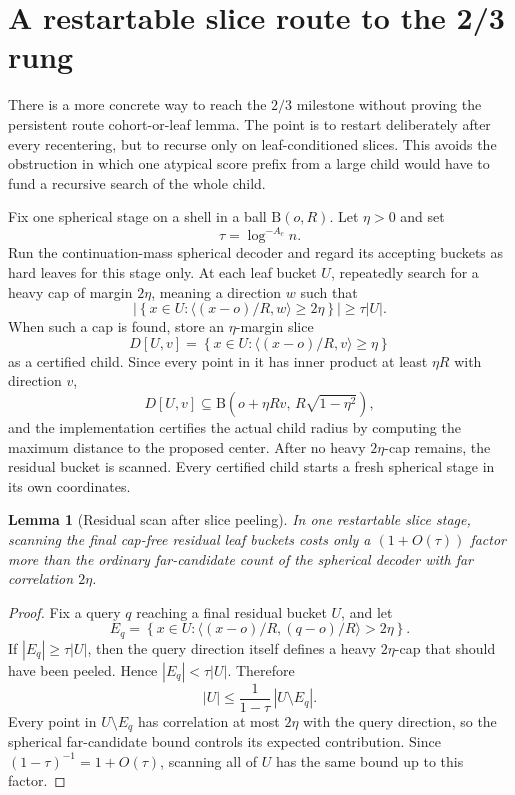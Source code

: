 \documentclass[10pt]{article}
\newtheorem{lemma}[theorem]{Lemma}
\theoremstyle{definition}
\newcommand{\Ball}{\mathrm{B}}
\newcommand{\ip}[2]{\langle #1,#2\rangle}
\begin{document}
\section{A restartable slice route to the 2/3 rung}

There is a more concrete way to reach the $2/3$ milestone without proving the persistent route cohort-or-leaf lemma. The point is to restart deliberately after every recentering, but to recurse only on leaf-conditioned slices. This avoids the obstruction in which one atypical score prefix from a large child would have to fund a recursive search of the whole child.

Fix one spherical stage on a shell in a ball $\Ball(o,R)$. Let $\eta>0$ and set
\[
   \tau=\log^{-A_c} n.
\]
Run the continuation-mass spherical decoder and regard its accepting buckets as hard leaves for this stage only. At each leaf bucket $U$, repeatedly search for a heavy cap of margin $2\eta$, meaning a direction $w$ such that
\[
   \left|\left\{x\in U:\ip{(x-o)/R}{w}\ge 2\eta\right\}\right|
   \ge \tau |U|.
\]
When such a cap is found, store an $\eta$-margin slice
\[
   D[U,v]=\left\{x\in U:\ip{(x-o)/R}{v}\ge \eta\right\}
\]
as a certified child. Since every point in it has inner product at least $\eta R$ with direction $v$,
\[
   D[U,v]\subseteq \Ball(o+\eta Rv,\,R\sqrt{1-\eta^2}),
\]
and the implementation certifies the actual child radius by computing the maximum distance to the proposed center. After no heavy $2\eta$-cap remains, the residual bucket is scanned. Every certified child starts a fresh spherical stage in its own coordinates.

\begin{lemma}[Residual scan after slice peeling]\label{lem:slice-residual}
   In one restartable slice stage, scanning the final cap-free residual leaf buckets costs only a $(1+O(\tau))$ factor more than the ordinary far-candidate count of the spherical decoder with far correlation $2\eta$.
\end{lemma}

\begin{proof}
   Fix a query $q$ reaching a final residual bucket $U$, and let
   \[
      E_q=\left\{x\in U:\ip{(x-o)/R}{(q-o)/R}>2\eta\right\}.
   \]
   If $|E_q|\ge\tau |U|$, then the query direction itself defines a heavy $2\eta$-cap that should have been peeled. Hence $|E_q|<\tau |U|$. Therefore
   \[
      |U|\le \frac{1}{1-\tau}\,|U\setminus E_q|.
   \]
   Every point in $U\setminus E_q$ has correlation at most $2\eta$ with the query direction, so the spherical far-candidate bound controls its expected contribution. Since $(1-\tau)^{-1}=1+O(\tau)$, scanning all of $U$ has the same bound up to this factor.
\end{proof}
\end{document}
